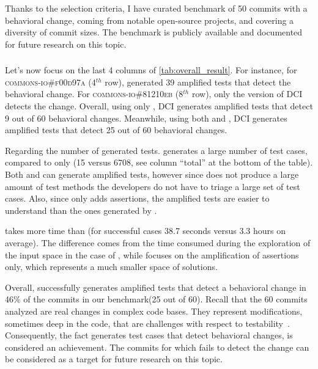 Thanks to the selection criteria, I have curated benchmark of 50 commits with a behavioral change, coming from notable open-source projects, and covering a diversity of commit sizes. 
The benchmark is publicly available and documented for future research on this topic.

\subsubsection{\rqdetection}
\label{subsec:dci:evaluation:rq1}

Let's now focus on the last 4 columns of \autoref{tab:overall_result}.
For instance, for \textsc{commons-io\#f00d97a} (4$^{th}$ row), \DCII generated 39 amplified tests that detect the behavioral change. 
For \textsc{commons-io\#81210eb} (8$^{th}$ row), only the \sbampl version of DCI detects the change.
%
Overall, using only \aampl, DCI generates amplified tests that detect 9 out of 60 behavioral changes.
Meanwhile, using both \aampl and \sbampl, DCI generates amplified tests that detect 25 out of 60 behavioral changes.

Regarding the number of generated tests.
\DCII generates a large number of test cases, compared to \DCIA only (15 versus 6708, see column ``total'' at the bottom of the table). 
Both \DCIA and \DCII can generate amplified tests, however since \DCIA does not produce a large amount of test methods the developers do not have to triage a large set of test cases.
Also, since \DCIA only adds assertions, the amplified tests are easier to understand than the ones generated by \DCII.

\DCII takes more time than \DCIA (for successful cases 38.7 seconds versus 3.3 hours on average).
The difference comes from the time consumed during the exploration of the input space in the case of \DCII, while \DCIA focuses on the amplification of assertions only, which represents a much smaller space of solutions. 

Overall, \DCI successfully generates amplified tests that detect a behavioral change in 46\% of the commits in our benchmark(25 out of 60).
Recall that the 60 commits analyzed are real changes in complex code bases.
They represent modifications, sometimes deep in the code, that are challenges with respect to testability~\cite{voas1995software}.
Consequently, the fact \DCI generates test cases that detect behavioral changes, is considered an achievement.
The commits for which \DCI fails to detect the change can be considered as a target for future research on this topic.

